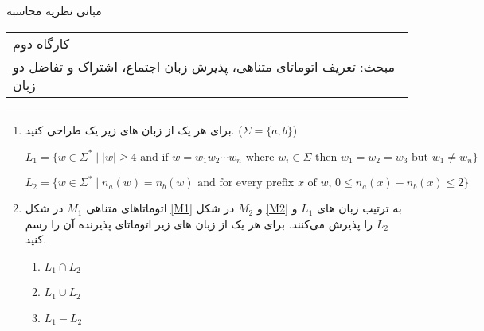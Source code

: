 \documentclass{article}
\begin{document}
	\begin{center}
		\Huge
		مبانی نظریه محاسبه
	\end{center}
	\Large
	\begin{tabularx}{\linewidth}{>{\raggedleft\arraybackslash}X}
		کارگاه دوم
		\\
		مبحث: تعریف اتوماتای متناهی، پذیرش زبان اجتماع، اشتراک و تفاضل دو زبان
		\\
		
	\end{tabularx}
	\rule{\textwidth}{1pt}
	\large
	\begin{enumerate}
		\item 
		برای هر یک از زبان های زیر یک  طراحی کنید. ($\Sigma = \{a, b\}$)
		
	\begin{latin}
		$L_{1} = \{w \in \Sigma^* \; | \; \text{$\lvert w \rvert \geq 4$ and if $w = w_{1}w_{2}\cdots w_{n}$ where $w_i \in \Sigma$ then $w_1 = w_2 = w_3$ but $w_1 \neq w_n$}\}$
		
		$L_{2} = \{w \in \Sigma^* \; | \; \text{$n_a(w) =  n_b(w)$ and for every prefix $x$ of $w$, $0 \leq n_a(x) - n_b(x) \leq 2$}\}$
	\end{latin}

			\item 
			اتوماتاهای متناهی $ M_1 $ در شکل \ref{M1} و $ M_2 $ در شکل \ref{M2} به ترتیب زبان های $L_1$  و $L_2$ را پذیرش
			 می‌کنند. برای هر یک از زبان های زیر اتوماتای پذیرنده آن را رسم کنید.
			 
			
			
		\begin{enumerate}
			 	\item 
			 		$L_1 \cap L_2$
			 	\item 
			 		$L_1 \cup L_2$
			 	\item
			 		$L_1 - L_2$
			 \end{enumerate}


\end{enumerate}
\end{document}
